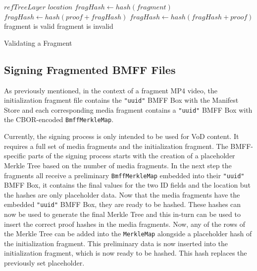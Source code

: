 \begin{algorithm}[H]
    \begin{algorithmic}[1]
        \Require $refTreeLayer$ 
        \Require $location$ 
        \State $fragHash \gets hash(fragment)$
                \State $fragHash \gets hash(proof + fragHash)$
            \Else
                \State $fragHash \gets hash(fragHash + proof)$
            \EndIf
        \EndFor
            \State fragment is valid
        \Else
            \State fragment is invalid
        \EndIf
    \end{algorithmic}
    \caption{Validating a Fragment}
    \label{alg:validate}
\end{algorithm}

\subsection{Signing Fragmented BMFF Files\label{sec:sign_bmff}}

As previously mentioned, in the context of a fragment MP4 video, the initialization fragment file contains the \texttt{"uuid"} BMFF Box with the Manifest Store and each corresponding media fragment contains a \texttt{"uuid"} BMFF Box with the CBOR-encoded \texttt{BmffMerkleMap}.

Currently, the signing process is only intended to be used for VoD content. It requires a full set of media fragments and the initialization fragment. The BMFF-specific parts of the signing process starts with the creation of a placeholder Merkle Tree based on the number of media fragments. In the next step the fragments all receive a preliminary \texttt{BmffMerkleMap} embedded into their \texttt{"uuid"} BMFF Box, it contains the final values for the two ID fields and the location but the hashes are only placeholder data. Now that the media fragments have the embedded \texttt{"uuid"} BMFF Box, they are ready to be hashed. These hashes can now be used to generate the final Merkle Tree and this in-turn can be used to insert the correct proof hashes in the media fragments. Now, any of the rows of the Merkle Tree can be added into the \texttt{MerkleMap} alongside a placeholder hash of the initialization fragment. This preliminary data is now inserted into the initialization fragment, which is now ready to be hashed. This hash replaces the previously set placeholder.